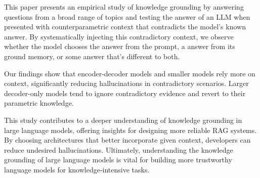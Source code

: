 This paper presents an empirical study of knowledge grounding by answering questions from a broad range of topics and testing the answer of an LLM when presented with counterparametric context that contradicts the model's known answer.
By systematically injecting this contradictory context, we observe whether the model chooses the \Contextual{} answer from the prompt, a \Parametric{} answer from its ground memory, or some \Other{} answer that's different to both.

Our findings show that encoder-decoder models and smaller models rely more on context, significantly reducing hallucinations in contradictory scenarios.
Larger decoder-only models tend to ignore contradictory evidence and revert to their parametric knowledge.

This study contributes to a deeper understanding of knowledge grounding in large language models, offering insights for designing more reliable RAG systems.
By choosing architectures that better incorporate given context, developers can reduce undesired hallucinations.
Ultimately, understanding the knowledge grounding of large language models is vital for building more trustworthy language models for knowledge-intensive tasks.
